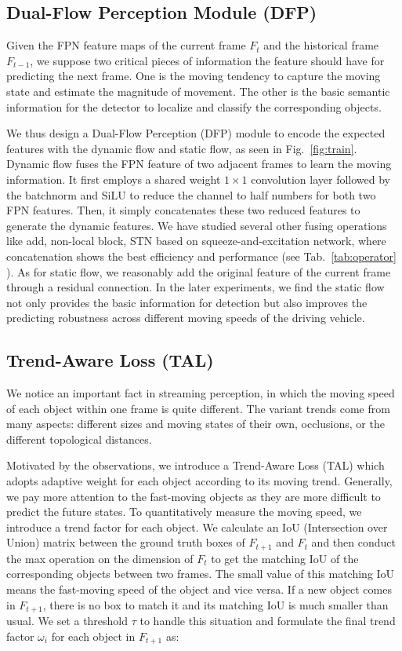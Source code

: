 \documentclass[10pt,twocolumn,letterpaper]{article}
\begin{document}
\subsection{Dual-Flow Perception Module (DFP)}
Given the FPN feature maps of the current frame $F_{t}$ and the historical frame $F_{t-1}$, we suppose two critical pieces of information the feature should have for predicting the next frame. One is the moving tendency to capture the moving state and estimate the magnitude of movement. The other is the basic semantic information for the detector to localize and classify the corresponding objects.

We thus design a Dual-Flow Perception (DFP) module to encode the expected features with the dynamic flow and static flow, as seen in Fig.~\ref{fig:train}. Dynamic flow fuses the FPN feature of two adjacent frames to learn the moving information. It first employs a shared weight $1\times1$ convolution layer followed by the batchnorm and SiLU \cite{swish} to reduce the channel to half numbers for both two FPN features. Then, it simply concatenates these two reduced features to generate the dynamic features. We have studied several other fusing operations like add, non-local block\cite{nonlocal}, STN\cite{stn} based on squeeze-and-excitation network\cite{senet}, where concatenation shows the best efficiency and performance (see Tab.~\ref{tab:operator} ). As for static flow, we reasonably add the original feature of the current frame through a residual connection. In the later experiments, we find the static flow not only provides the basic information for detection but also improves the predicting robustness across different moving speeds of the driving vehicle. 

\subsection{Trend-Aware Loss (TAL)}
We notice an important fact in streaming perception, in which the moving speed of each object within one frame is quite different. The variant trends come from many aspects: different sizes and moving states of their own, occlusions, or the different topological distances. 

Motivated by the observations, we introduce a Trend-Aware Loss (TAL) which adopts adaptive weight for each object according to its moving trend. Generally, we pay more attention to the fast-moving objects as they are more difficult to predict the future states. To quantitatively measure the moving speed, we introduce a trend factor for each object. We calculate an IoU (Intersection over Union) matrix between the ground truth boxes of $F_{t+1}$ and $F_{t}$ and then conduct the max operation on the dimension of $F_{t}$ to get the matching IoU of the corresponding objects between two frames. The small value of this matching IoU means the fast-moving speed of the object and vice versa. 
If a new object comes in $F_{t+1}$, there is no box to match it and its matching IoU is much smaller than usual. We set a threshold $\tau$ to handle this situation and formulate the final trend factor $\omega_i$ for each object in $F_{t+1}$ as:
\end{document}
